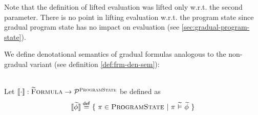 Note that the definition of lifted evaluation was lifted only w.r.t. the second parameter.
There is no point in lifting evaluation w.r.t. the program state since gradual program state has no impact on evaluation (see \ref{sec:gradual-program-state}).

We define denotational semantics of gradual formulas analogous to the non-gradual variant (see definition \ref{def:frm-den-sem}):
\begin{definition}~\\
    \label{def:gfrm-den-sem}
    Let $\llbracket {\cdot} \rrbracket : \textup{\textsc{\ensuremath{\widetilde{\text{F}}}ormula}} \rightarrow \mathcal{P}^{\textup{\textsc{ProgramState}}}$ be defined as
    \begin{displaymath}
    \llbracket {\widetilde{\phi}} \rrbracket \overset{\textup{\textmd{\textsf{def}}}}{=} \{~ \pi \in \textup{\textsc{ProgramState}} ~|~ \pi \,\,\widetilde{\vDash}\,\, \widetilde{\phi} ~\}
    \end{displaymath}
\end{definition}

